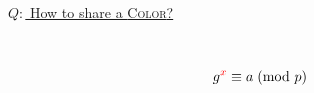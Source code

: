 \begin{frame}
  \begin{definition}
  \end{definition}
\end{frame}

\begin{frame}

  \pause
  \vspace{0.50cm}
  \begin{center}
	\href{https://youtu.be/3QnD2c4Xovk}{\large $Q:$ How to share a \textsc{Color}?}
  \end{center}
\end{frame}

\begin{frame}
  \begin{center}
	 \\
  \end{center}

  \pause
  \begin{definition}
	\[
	  g^{\textcolor{red}{x}} \equiv a \;(\text{mod } p)
	\]
  \end{definition}

\end{frame}

